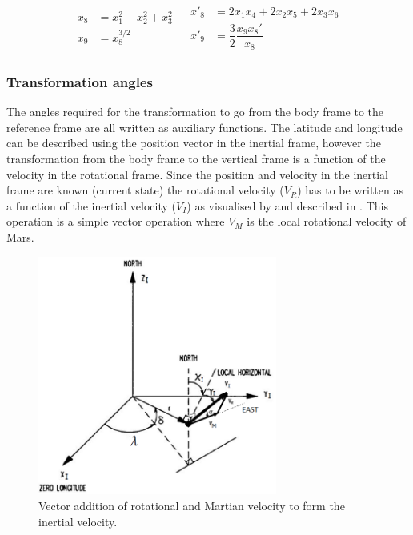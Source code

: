 \begin{align} \label{eq:gravAux}
\begin{split} 
x_{8}&=x_{1}^{2}+x_{2}^{2}+x_{3}^{2}\\
x_{9}&=x_{8}^{3/2}
\end{split} 
&
\begin{split}
x'_{8}&=2x_{1}x_{4}+2x_{2}x_{5}+2x_{3}x_{6}\\
x'_{9}&=\dfrac{3}{2}\dfrac{x_{9}x_{8}'}{x_{8}}
\end{split}
\end{align}
 
 
 \subsubsection{Transformation angles}
 \label{subsubsec:tsiTransAngl}
 The angles required for the transformation to go from the body frame to the reference frame are all written as auxiliary functions. The latitude and longitude can be described using the position vector in the inertial frame, however the transformation from the body frame to the vertical frame is a function of the velocity in the rotational frame. Since the position and velocity in the inertial frame are known (current state) the rotational velocity ($V_{R}$) has to be written as a function of the inertial velocity ($V_{I}$) as visualised by  and described in . This operation is a simple vector operation where $V_{M}$ is the local rotational velocity of Mars.
 
 \begin{figure}[!ht]
\centering
\includegraphics[width=0.7\textwidth]{figures/tsi/rotational_inertial_martian_velocity.png}
\caption{Vector addition of rotational and Martian velocity to form the inertial velocity.}
\label{fig:rotational_inertial_martian_velocity}
\end{figure}
 
